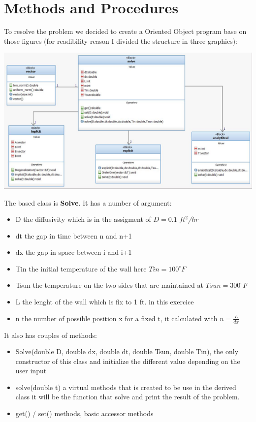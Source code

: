 \documentclass [10 pt, a4 paper]{article}
\begin{document}

\section{Methods and Procedures}

    To resolve the problem we decided to create a Oriented Object program base on 
those figures (for readibility reason I divided the structure in three graphics):
\begin{center}
    \includegraphics[scale=0.6]{Chart/General.JPG}
\end{center}
The based class is \textbf{Solve}. It has a number of argument:
\begin{itemize}
    \item D the diffusivity which is in the assigment of $D = 0.1$  \textit{$ft^{2}$/hr}
    \item dt the gap in time between n and n+1
    \item dx the gap in space between i and i+1
    \item Tin the initial temperature of the wall here $Tin = 100^{\circ}F$
    \item Tsun the temperature on the two sides that are maintained at $Tsun = 300^{\circ}F$
    \item L the lenght of the wall which is fix to 1 ft. in this exercice
    \item n the number of possible position x for a fixed t, it calculated with $n = \frac{L}{dx}$
\end{itemize}

\vspace{0.3cm}
It also has couples of methods:
\begin{itemize}
    \item Solve(double D, double dx, double dt, double Tsun, double Tin), the only constructor of 
    this class and initialize the different value depending on the user input
    \item solve(double t) a virtual methods that is created to be use in the derived class it will be the function
    that solve and print the result of the problem.
    \item get() / set() methods, basic accessor methods   
\end{itemize}
\end{document}
